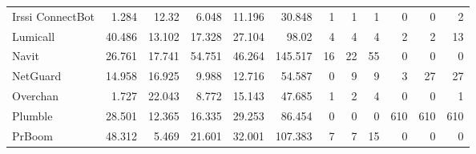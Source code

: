 \begin{table*}[t]
\begin{tabular}{l||r|r|r|r|r||r|r|r||r|r|r}
  Irssi ConnectBot       & 1.284                 & 12.32                    & 6.048                      & 11.196                                     & 30.848                                  & 1                           & 1                            & 1                         & 0                           & 0                            & 2                          \\
  Lumicall               & 40.486                & 13.102                   & 17.328                     & 27.104                                     & 98.02                                   & 4                           & 4                            & 4                         & 2                           & 2                            & 13                         \\
  Navit                  & 26.761                & 17.741                   & 54.751                     & 46.264                                     & 145.517                                 & 16                          & 22                           & 55                        & 0                           & 0                            & 0                          \\
  NetGuard               & 14.958                & 16.925                   & 9.988                      & 12.716                                     & 54.587                                  & 0                           & 9                            & 9                         & 3                           & 27                           & 27                         \\
  Overchan               & 1.727                 & 22.043                   & 8.772                      & 15.143                                     & 47.685                                  & 1                           & 2                            & 4                         & 0                           & 0                            & 1                          \\
  Plumble                & 28.501                & 12.365                   & 16.335                     & 29.253                                     & 86.454                                  & 0                           & 0                            & 0                         & 610                         & 610                          & 610                        \\
  PrBoom                 & 48.312                & 5.469                    & 21.601                     & 32.001                                     & 107.383                                 & 7                           & 7                            & 15                        & 0                           & 0                            & 0                          \\

\end{tabular}
\end{table*}
